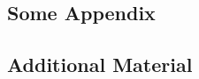 \begin{appendices}

\chapter{Some Appendix}
\label{appendix}

\section{Additional Material}

\end{appendices}
